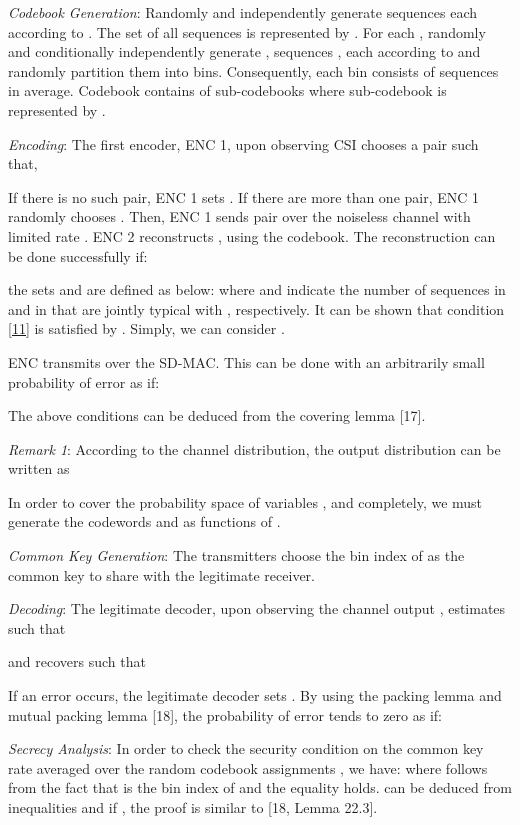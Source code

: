 \documentclass[conference,8pt]{IEEEtran}
\begin{document}
{{{{\emph{Codebook Generation}: Randomly and independently generate  sequences  each according to . The set of all sequences  is represented by . For each , randomly and conditionally independently generate , sequences , each according to  and randomly partition them into  bins. Consequently, each bin consists of  sequences  in average. Codebook  contains of  sub-codebooks where sub-codebook  is represented by .


\emph{Encoding}: The first encoder, ENC 1, upon observing CSI  chooses a pair  such that,

If there is no such pair, ENC 1 sets . If there are more than one pair, ENC 1 randomly chooses . Then, ENC 1 sends pair  over the noiseless channel with limited rate . ENC 2 reconstructs , using the codebook. The reconstruction can be done successfully if:

the sets  and  are defined as below:
where  and  indicate the number of sequences  in  and  in  that are jointly typical with , respectively. It can be shown that condition \eqref{11} is satisfied by . Simply, we can consider .

ENC  transmits  over the SD-MAC. This can be done with an arbitrarily small probability of error as  if:

The above conditions can be deduced from the covering lemma [17].


\emph{Remark 1}: According to the channel distribution, the output distribution  can be written as

In order to cover the probability space of variables ,  and  completely, we must generate the codewords  and  as functions of .


\emph{Common Key Generation}: The transmitters choose the bin index of  as the common key to share with the legitimate receiver.


\emph{Decoding}: The legitimate decoder, upon observing the channel output , estimates  such that

and recovers  such that

If an error occurs, the legitimate decoder sets . By using the packing lemma and mutual packing lemma [18], the probability of error tends to zero as  if:



\emph{Secrecy Analysis}: In order to check the security condition on the common key rate averaged over the random codebook assignments , we have:
where  follows from the fact that  is the bin index of  and the equality  holds.  can be deduced from inequalities  and  if , the proof is similar to [18, Lemma 22.3].

}}}}
\end{document}
